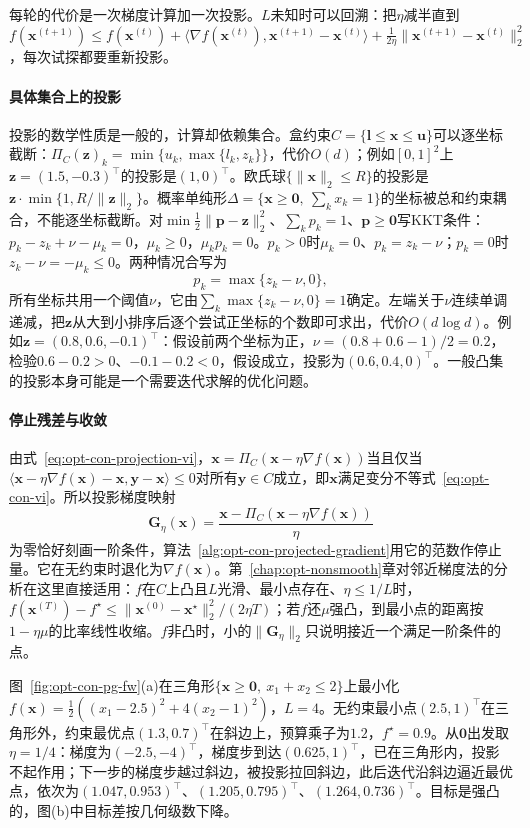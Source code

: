 每轮的代价是一次梯度计算加一次投影。$L$未知时可以回溯：把$\eta$减半直到$f(\bm x^{(t+1)})\leq f(\bm x^{(t)})+\langle\nabla f(\bm x^{(t)}),\bm x^{(t+1)}-\bm x^{(t)}\rangle+\frac1{2\eta}\lVert\bm x^{(t+1)}-\bm x^{(t)}\rVert_2^2$，每次试探都要重新投影。

\paragraph{具体集合上的投影}
投影的数学性质是一般的，计算却依赖集合。盒约束$C=\{\bm l\leq\bm x\leq\bm u\}$可以逐坐标截断：$\Pi_C(\bm z)_k=\min\{u_k,\max\{l_k,z_k\}\}$，代价$O(d)$；例如$[0,1]^2$上$\bm z=(1.5,-0.3)^\top$的投影是$(1,0)^\top$。欧氏球$\{\lVert\bm x\rVert_2\leq R\}$的投影是$\bm z\cdot\min\{1,R/\lVert\bm z\rVert_2\}$。概率单纯形$\Delta=\{\bm x\geq\bm0,\ \sum_kx_k=1\}$的坐标被总和约束耦合，不能逐坐标截断。对$\min\frac12\lVert\bm p-\bm z\rVert_2^2$、$\sum_kp_k=1$、$\bm p\geq\bm0$写KKT条件：$p_k-z_k+\nu-\mu_k=0$，$\mu_k\geq0$，$\mu_kp_k=0$。$p_k>0$时$\mu_k=0$、$p_k=z_k-\nu$；$p_k=0$时$z_k-\nu=-\mu_k\leq0$。两种情况合写为
\[
  p_k=\max\{z_k-\nu,0\},
\]
所有坐标共用一个阈值$\nu$，它由$\sum_k\max\{z_k-\nu,0\}=1$确定。左端关于$\nu$连续单调递减，把$\bm z$从大到小排序后逐个尝试正坐标的个数即可求出，代价$O(d\log d)$。例如$\bm z=(0.8,0.6,-0.1)^\top$：假设前两个坐标为正，$\nu=(0.8+0.6-1)/2=0.2$，检验$0.6-0.2>0$、$-0.1-0.2<0$，假设成立，投影为$(0.6,0.4,0)^\top$。一般凸集的投影本身可能是一个需要迭代求解的优化问题。

\paragraph{停止残差与收敛}
由式~\eqref{eq:opt-con-projection-vi}，$\bm x=\Pi_C(\bm x-\eta\nabla f(\bm x))$当且仅当$\langle\bm x-\eta\nabla f(\bm x)-\bm x,\bm y-\bm x\rangle\leq0$对所有$\bm y\in C$成立，即$\bm x$满足变分不等式~\eqref{eq:opt-con-vi}。所以投影梯度映射
\[
  \bm G_\eta(\bm x)=\frac{\bm x-\Pi_C(\bm x-\eta\nabla f(\bm x))}{\eta}
\]
为零恰好刻画一阶条件，算法~\ref{alg:opt-con-projected-gradient}用它的范数作停止量。它在无约束时退化为$\nabla f(\bm x)$。第~\ref{chap:opt-nonsmooth}章对邻近梯度法的分析在这里直接适用：$f$在$C$上凸且$L$光滑、最小点存在、$\eta\leq1/L$时，$f(\bm x^{(T)})-f^\star\leq\lVert\bm x^{(0)}-\bm x^\star\rVert_2^2/(2\eta T)$；若$f$还$\mu$强凸，到最小点的距离按$1-\eta\mu$的比率线性收缩。$f$非凸时，小的$\lVert\bm G_\eta\rVert_2$只说明接近一个满足一阶条件的点。

图~\ref{fig:opt-con-pg-fw}(a)在三角形$\{\bm x\geq\bm0,\ x_1+x_2\leq2\}$上最小化$f(\bm x)=\frac12((x_1-2.5)^2+4(x_2-1)^2)$，$L=4$。无约束最小点$(2.5,1)^\top$在三角形外，约束最优点$(1.3,0.7)^\top$在斜边上，预算乘子为$1.2$，$f^\star=0.9$。从$\bm0$出发取$\eta=1/4$：梯度为$(-2.5,-4)^\top$，梯度步到达$(0.625,1)^\top$，已在三角形内，投影不起作用；下一步的梯度步越过斜边，被投影拉回斜边，此后迭代沿斜边逼近最优点，依次为$(1.047,0.953)^\top$、$(1.205,0.795)^\top$、$(1.264,0.736)^\top$。目标是强凸的，图(b)中目标差按几何级数下降。

